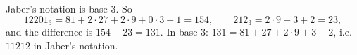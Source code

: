 Jaber's notation is base $3$. So
\[12201_3=81+2\cdot27+2\cdot9+0\cdot3+1=154,\qquad212_3=2\cdot9+3+2=23,\]
and the difference is $154-23=\boxed{131}$. In base $3$: $131=81+27+2\cdot9+3+2$, i.e. $\boxed{11212}$ in Jaber's notation.
